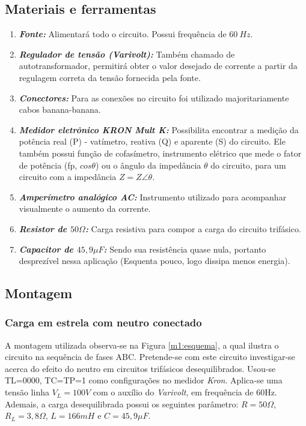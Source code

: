 \documentclass[a4paper,12pt,oneside,openany,table,xcdraw]{article}
\begin{document}
\subsection{Materiais e ferramentas} %
\begin{enumerate}[1 -]
\item \emph{\textbf{Fonte:}}
Alimentará todo o circuito. Possui frequência de $60\ Hz$.

\item \emph{\textbf{Regulador de tensão (Varivolt):}}
Também chamado de autotransformador, permitirá obter o valor desejado de corrente a partir da regulagem correta da tensão fornecida pela fonte.

\item \emph{\textbf{Conectores:}}
Para as conexões no circuito foi utilizado majoritariamente cabos banana-banana.

\item \emph{\textbf{Medidor eletrônico KRON Mult K:}}
Possibilita encontrar a medição da potência real (P) - vatímetro, reativa (Q) e aparente (S) do circuito. Ele também possui função de cofasímetro, instrumento elétrico que mede o fator de potência (fp, $cos\theta$) ou o ângulo da impedância $\theta$ do circuito, para um circuito com a impedância $Z = Z\angle \theta$.

\item \emph{\textbf{Amperímetro analógico AC:}}
Instrumento utilizado para acompanhar visualmente o aumento da corrente.

\item \emph{\textbf{Resistor de $50\Omega$:}}
Carga resistiva para compor a carga do circuito trifásico.

\item \emph{\textbf{Capacitor de $45,9\mu F$:}}
Sendo sua resistência quase nula, portanto desprezível nessa aplicação (Esquenta pouco, logo dissipa menos energia).
\end{enumerate}

\vspace{0.2cm}
\subsection{Montagem} %

\subsubsection{Carga em estrela com neutro conectado} \label{m1:montagem}
A montagem utilizada observa-se na Figura \ref{m1:esquema}, a qual ilustra o circuito na sequência de fases ABC. Pretende-se com este circuito investigar-se acerca do efeito do neutro em circuitos trifásicos desequilibrados. Usou-se TL=0000, TC=TP=1 como configurações no medidor \emph{Kron}. Aplica-se uma tensão linha $V_L=100V$ com o auxílio do \emph{Varivolt}, em frequência de 60Hz. Ademais, a carga desequilibrada possui os seguintes parâmetro: $R=50\Omega$, $R_L=3,8\Omega$, $L=166mH$ e $C=45,9 \mu F$.
\end{document}
